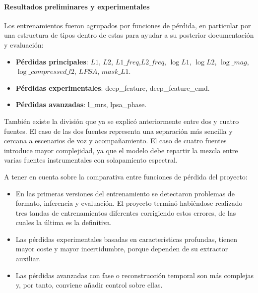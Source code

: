 \paragraph{Resultados preliminares y experimentales}

Los entrenamientos fueron agrupados por funciones de pérdida, en particular por una estructura de tipos dentro de estas para ayudar a su posterior documentación y evaluación:

\begin{itemize}
    \item \textbf{Pérdidas principales}: $L1$, $L2$, $L1\_freq$,$L2\_freq$, $\log L1$, $\log L2$, $\log\_mag$, $\log\_compressed\_l2$, $LPSA$, $mask\_L1$.
    \item \textbf{Pérdidas experimentales}: deep\_feature, deep\_feature\_emd.
    \item \textbf{Pérdidas avanzadas}: l\_mrs, lpsa\_phase.
\end{itemize}

También existe la división que ya se explicó anteriormente entre dos y cuatro fuentes. El caso de las dos fuentes representa una separación más sencilla y cercana a escenarios de voz y acompañamiento.
El caso de cuatro fuentes introduce mayor complejidad, ya que el modelo debe repartir la mezcla entre varias fuentes instrumentales con solapamiento espectral.

A tener en cuenta sobre la comparativa entre funciones de pérdida del proyecto:

\begin{itemize}
    \item En las primeras versiones del entrenamiento se detectaron problemas de formato, inferencia y evaluación. El proyecto terminó habiéndose realizado tres tandas de entrenamientos diferentes corrigiendo estos errores, de las cuales la última es la definitiva.
    \item Las pérdidas experimentales basadas en características profundas, tienen mayor coste y mayor incertidumbre, porque dependen de su extractor auxiliar.
    \item Las pérdidas avanzadas con fase o reconstrucción temporal son más complejas y, por tanto, conviene añadir control sobre ellas.
\end{itemize}
